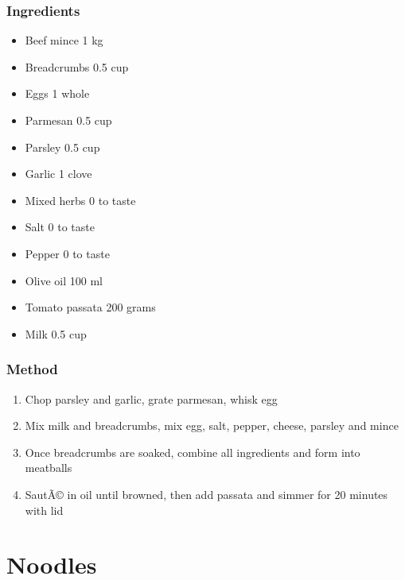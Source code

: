 \documentclass[]{article}
\begin{document}
\subsubsection*{\Large Ingredients}
\begin{multicols}{2}
\begin{itemize}
 \item Beef mince \hfill 1 kg
 \item Breadcrumbs \hfill 0.5 cup
 \item Eggs \hfill 1 whole
 \item Parmesan \hfill 0.5 cup
 \item Parsley \hfill 0.5 cup
 \item Garlic \hfill 1 clove
 \item Mixed herbs \hfill 0 to taste
 \item Salt \hfill 0 to taste
 \item Pepper \hfill 0 to taste
 \item Olive oil \hfill 100 ml
 \item Tomato passata \hfill 200 grams
 \item Milk \hfill 0.5 cup
\end{itemize}
\end{multicols}
\subsubsection*{\Large Method}
\begin{enumerate}[font=\huge\color{accent}]
	\item Chop parsley and garlic, grate parmesan, whisk egg
	\item Mix milk and breadcrumbs, mix egg, salt, pepper, cheese, parsley and mince
	\item Once breadcrumbs are soaked, combine all ingredients and form into meatballs
	\item SautÃ© in oil until browned, then add passata and simmer for 20 minutes with lid
\end{enumerate}
\newpage
{}
\section*{\center\Huge\color{accent}Noodles}
\label{cat:Noodles}
\label{rec:Chow Mein}
\end{document}
